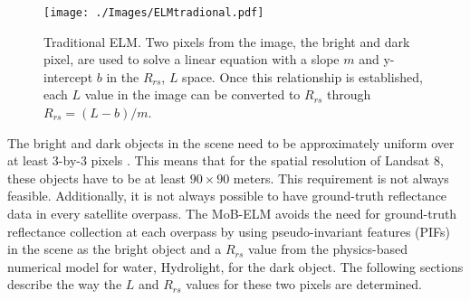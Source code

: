 \documentclass[onecolumn,3p,letterpaper,11pt]{elsarticle}
\begin{document}
 








\begin{figure}[htb]
	\centering
\texttt{[image: ./Images/ELMtradional.pdf]}
\caption{Traditional ELM. Two pixels from the image, the bright and dark pixel, are used to solve a linear equation with a slope $m$ and y-intercept $b$ in the $R_{rs}$, $L$ space. Once this relationship is established, each $L$ value in the image can be converted to $R_{rs}$ through $R_{rs}=(L-b)/m$. \label{fig:ELMregression}}
\end{figure}

The bright and dark objects in the scene need to be approximately uniform over at least 3-by-3 pixels \citep{Schott}. This means that for the spatial resolution of Landsat 8, these objects have to be at least $90\times 90$ meters. This requirement is not always feasible. Additionally, it is not always possible to have ground-truth reflectance data in every satellite overpass. The MoB-ELM avoids the need for ground-truth  reflectance collection at each overpass by using pseudo-invariant features (PIFs) in the scene as the bright object and a $R_{rs}$ value from the physics-based numerical model for water, Hydrolight, for the dark object. The following sections describe the way the $L$ and $R_{rs}$ values for these two pixels are determined.
\end{document}
